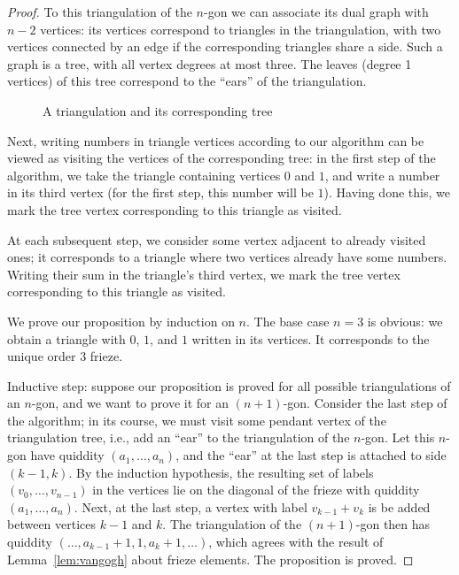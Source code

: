 \documentclass[a4paper,11pt]{amsart}
\theoremstyle{plain}
\theoremstyle{remark}
\theoremstyle{definition}
\numberwithin{equation}{section}
\numberwithin{figure}{section}
\begin{document}
\begin{proof}
To this triangulation of the $n$-gon we can associate its dual graph with $n-2$ vertices: its vertices correspond to triangles in the triangulation, with two vertices connected by an edge if the corresponding triangles share a side. Such a graph is a tree, with all vertex degrees at most three. The leaves (degree 1 vertices) of this tree correspond to the ``ears'' of the triangulation.
\begin{figure}[h!]
\caption{A triangulation and its corresponding tree}\label{fig:triang}
\end{figure}

Next, writing numbers in triangle vertices according to our algorithm can be viewed as visiting the vertices of the corresponding tree: in the first step of the algorithm, we take the triangle containing vertices $0$ and $1$, and write a number in its third vertex (for the first step, this number will be $1$). Having done this, we mark the tree vertex corresponding to this triangle as visited.

At each subsequent step, we consider some vertex adjacent to already visited ones; it corresponds to a triangle where two vertices already have some numbers. Writing their sum in the triangle's third vertex, we mark the tree vertex corresponding to this triangle as visited.

We prove our proposition by induction on $n$. The base case $n=3$ is obvious: we obtain a triangle with $0$, $1$, and $1$ written in its vertices. It corresponds to the unique order $3$ frieze.

Inductive step: suppose our proposition is proved for all possible triangulations of an $n$-gon, and we want to prove it for an $(n+1)$-gon. Consider the last step of the algorithm; in its course, we must visit some pendant vertex of the triangulation tree, i.e., add an ``ear'' to the triangulation of the $n$-gon. Let this $n$-gon have quiddity $(a_1,\dots,a_n)$, and the ``ear'' at the last step is attached to side $(k-1,k)$. By the induction hypothesis, the resulting set of labels $(v_0,\dots,v_{n-1})$ in the vertices  lie on the diagonal of the frieze with quiddity $(a_1,\dots,a_n)$. Next, at the last step, a vertex with label $v_{k-1}+v_k$ is be added between vertices $k-1$ and $k$. The triangulation of the $(n+1)$-gon  then has quiddity $(\dots,a_{k-1}+1,1,a_k+1,\dots)$, which agrees with the result of Lemma~\ref{lem:vangogh} about frieze elements. The proposition is proved.
\end{proof}
\end{document}
